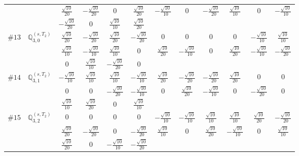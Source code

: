 \documentclass[fleqn,9pt,landscape]{jsarticle}
\begin{document}
\begin{center}
\begin{longtable}{lcccccccccc}
& $ \frac{\sqrt{10}}{20} $ & $ - \frac{\sqrt{10}}{20} $ & $ 0 $ & $ \frac{\sqrt{10}}{20} $ & $ - \frac{\sqrt{10}}{10} $ & $ 0 $ & $ - \frac{\sqrt{10}}{20} $ & $ \frac{\sqrt{10}}{10} $ & $ 0 $ & $ - \frac{\sqrt{10}}{10} $ \\
& $ - \frac{\sqrt{10}}{20} $ & $ 0 $ & $ \frac{\sqrt{10}}{10} $ & $ \frac{\sqrt{10}}{20} $ & $  $ & $  $ & $  $ & $  $ & $  $ & $  $ \\ \hline
$ \#13\quad \mathbb{Q}_{3,0}^{(s,T_{2})} $ & $ \frac{\sqrt{10}}{20} $ & $ - \frac{\sqrt{10}}{20} $ & $ \frac{\sqrt{10}}{20} $ & $ - \frac{\sqrt{10}}{20} $ & $ 0 $ & $ 0 $ & $ 0 $ & $ 0 $ & $ - \frac{\sqrt{10}}{10} $ & $ \frac{\sqrt{10}}{10} $ \\
& $ \frac{\sqrt{10}}{10} $ & $ - \frac{\sqrt{10}}{10} $ & $ \frac{\sqrt{10}}{10} $ & $ 0 $ & $ \frac{\sqrt{10}}{20} $ & $ - \frac{\sqrt{10}}{10} $ & $ 0 $ & $ \frac{\sqrt{10}}{20} $ & $ - \frac{\sqrt{10}}{10} $ & $ - \frac{\sqrt{10}}{20} $ \\
& $ 0 $ & $ \frac{\sqrt{10}}{10} $ & $ - \frac{\sqrt{10}}{20} $ & $ 0 $ & $  $ & $  $ & $  $ & $  $ & $  $ & $  $ \\ \hline
$ \#14\quad \mathbb{Q}_{3,1}^{(s,T_{2})} $ & $ - \frac{\sqrt{10}}{10} $ & $ \frac{\sqrt{10}}{10} $ & $ \frac{\sqrt{10}}{10} $ & $ - \frac{\sqrt{10}}{10} $ & $ \frac{\sqrt{10}}{20} $ & $ - \frac{\sqrt{10}}{20} $ & $ - \frac{\sqrt{10}}{20} $ & $ \frac{\sqrt{10}}{20} $ & $ 0 $ & $ 0 $ \\
& $ 0 $ & $ 0 $ & $ - \frac{\sqrt{10}}{20} $ & $ - \frac{\sqrt{10}}{10} $ & $ 0 $ & $ \frac{\sqrt{10}}{20} $ & $ - \frac{\sqrt{10}}{10} $ & $ 0 $ & $ - \frac{\sqrt{10}}{20} $ & $ 0 $ \\
& $ \frac{\sqrt{10}}{10} $ & $ \frac{\sqrt{10}}{20} $ & $ 0 $ & $ \frac{\sqrt{10}}{10} $ & $  $ & $  $ & $  $ & $  $ & $  $ & $  $ \\ \hline
$ \#15\quad \mathbb{Q}_{3,2}^{(s,T_{2})} $ & $ 0 $ & $ 0 $ & $ 0 $ & $ 0 $ & $ - \frac{\sqrt{10}}{10} $ & $ - \frac{\sqrt{10}}{10} $ & $ \frac{\sqrt{10}}{10} $ & $ \frac{\sqrt{10}}{10} $ & $ \frac{\sqrt{10}}{20} $ & $ - \frac{\sqrt{10}}{20} $ \\
& $ \frac{\sqrt{10}}{20} $ & $ - \frac{\sqrt{10}}{20} $ & $ 0 $ & $ - \frac{\sqrt{10}}{20} $ & $ \frac{\sqrt{10}}{10} $ & $ 0 $ & $ \frac{\sqrt{10}}{20} $ & $ - \frac{\sqrt{10}}{10} $ & $ 0 $ & $ \frac{\sqrt{10}}{10} $ \\
& $ \frac{\sqrt{10}}{20} $ & $ 0 $ & $ - \frac{\sqrt{10}}{10} $ & $ - \frac{\sqrt{10}}{20} $ & $  $ & $  $ & $  $ & $  $ & $  $ & $  $ \\ \hline

\end{longtable}
\end{center}
\end{document}
